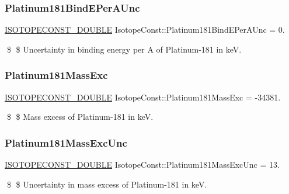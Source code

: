 \subsubsection{\texorpdfstring{Platinum181\+Bind\+E\+Per\+A\+Unc}{Platinum181BindEPerAUnc}}
{\footnotesize\ttfamily \mbox{\hyperlink{group___isotope_const-_macros_ga8f45a7272ce02c0b4c65c44636ed719a}{I\+S\+O\+T\+O\+P\+E\+C\+O\+N\+S\+T\+\_\+\+D\+O\+U\+B\+LE}} Isotope\+Const\+::\+Platinum181\+Bind\+E\+Per\+A\+Unc = 0.}

\$ \$ Uncertainty in binding energy per A of Platinum-\/181 in keV. \mbox{\label{group___isotope_const-_platinum-_pt181_gaae9b7925d927ad6222bc2af3ee223567}} 
\subsubsection{\texorpdfstring{Platinum181\+Mass\+Exc}{Platinum181MassExc}}
{\footnotesize\ttfamily \mbox{\hyperlink{group___isotope_const-_macros_ga8f45a7272ce02c0b4c65c44636ed719a}{I\+S\+O\+T\+O\+P\+E\+C\+O\+N\+S\+T\+\_\+\+D\+O\+U\+B\+LE}} Isotope\+Const\+::\+Platinum181\+Mass\+Exc = -\/34381.}

\$ \$ Mass excess of Platinum-\/181 in keV. \mbox{\label{group___isotope_const-_platinum-_pt181_gaea16e6db81c0cd417b7e52745fb97af6}} 
\subsubsection{\texorpdfstring{Platinum181\+Mass\+Exc\+Unc}{Platinum181MassExcUnc}}
{\footnotesize\ttfamily \mbox{\hyperlink{group___isotope_const-_macros_ga8f45a7272ce02c0b4c65c44636ed719a}{I\+S\+O\+T\+O\+P\+E\+C\+O\+N\+S\+T\+\_\+\+D\+O\+U\+B\+LE}} Isotope\+Const\+::\+Platinum181\+Mass\+Exc\+Unc = 13.}

\$ \$ Uncertainty in mass excess of Platinum-\/181 in keV. \mbox{\label{group___isotope_const-_platinum-_pt181_ga0d1806afc6616b58adf7fcdbabef2a0f}} 
